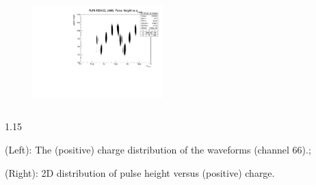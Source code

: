 \documentclass{beamer}
\begin{document}
\begin{frame}
\vspace{-2mm}
\begin{figure}[!h]
    \centering
    \includegraphics[width =0.45\textwidth]{figures/pdf/phtmean1.pdf}
    \label{fig:anglesinmuon}
\end{figure}
\vspace{-2mm}
        \begin{columns}
            \begin{column}{1.15\framewidth}
                \setlength{\leftmargini}{1.em}
                \begin{itemize}

      {\small  \item (Left): The (positive) charge distribution of the waveforms (channel 66).;
        \item (Right): 2D distribution of pulse height versus (positive) charge. }
    \end{itemize}
\end{column}
\end{columns}
\end{frame}
\end{document}
